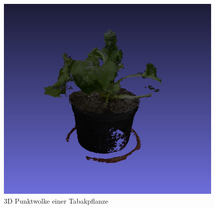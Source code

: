 \documentclass{llncs}
\begin{document}
\begin{figure}[htbp] 
	\centering
	\includegraphics[width=1.0\textwidth]{plant.png}
	\caption{3D Punktwolke einer Tabakpflanze}
	\label{fig:Bild100}
\end{figure}
\newpage
\end{document}
